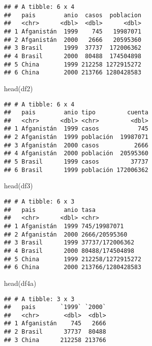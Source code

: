 \documentclass[
]{article}
\newenvironment{Shaded}{\begin{snugshade}}{\end{snugshade}}
\newcommand{\FunctionTok}[1]{\textcolor[rgb]{0.00,0.00,0.00}{#1}}
\newcommand{\NormalTok}[1]{#1}
\begin{document}
\begin{verbatim}
## # A tibble: 6 x 4
##   pais        anio  casos  poblacion
##   <chr>      <dbl>  <dbl>      <dbl>
## 1 Afganistán  1999    745   19987071
## 2 Afganistán  2000   2666   20595360
## 3 Brasil      1999  37737  172006362
## 4 Brasil      2000  80488  174504898
## 5 China       1999 212258 1272915272
## 6 China       2000 213766 1280428583
\end{verbatim}

\begin{Shaded}
\begin{Highlighting}[]
\FunctionTok{head}\NormalTok{(df2)}
\end{Highlighting}
\end{Shaded}

\begin{verbatim}
## # A tibble: 6 x 4
##   pais        anio tipo         cuenta
##   <chr>      <dbl> <chr>         <dbl>
## 1 Afganistán  1999 casos           745
## 2 Afganistán  1999 población  19987071
## 3 Afganistán  2000 casos          2666
## 4 Afganistán  2000 población  20595360
## 5 Brasil      1999 casos         37737
## 6 Brasil      1999 población 172006362
\end{verbatim}

\begin{Shaded}
\begin{Highlighting}[]
\FunctionTok{head}\NormalTok{(df3)}
\end{Highlighting}
\end{Shaded}

\begin{verbatim}
## # A tibble: 6 x 3
##   pais        anio tasa             
##   <chr>      <dbl> <chr>            
## 1 Afganistán  1999 745/19987071     
## 2 Afganistán  2000 2666/20595360    
## 3 Brasil      1999 37737/172006362  
## 4 Brasil      2000 80488/174504898  
## 5 China       1999 212258/1272915272
## 6 China       2000 213766/1280428583
\end{verbatim}

\begin{Shaded}
\begin{Highlighting}[]
\FunctionTok{head}\NormalTok{(df4a)}
\end{Highlighting}
\end{Shaded}

\begin{verbatim}
## # A tibble: 3 x 3
##   pais       `1999` `2000`
##   <chr>       <dbl>  <dbl>
## 1 Afganistán    745   2666
## 2 Brasil      37737  80488
## 3 China      212258 213766
\end{verbatim}
\end{document}
